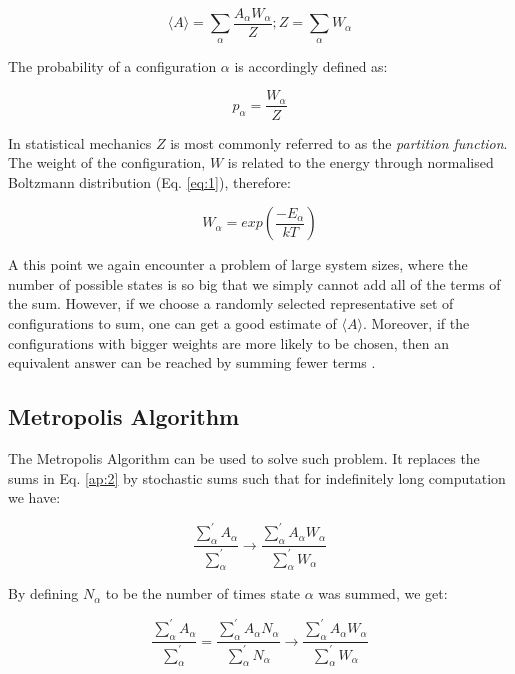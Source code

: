 \begin{equation}
\label{ap:2}
	\langle A \rangle = \sum_{\alpha} \frac{A_{\alpha}W_{\alpha}}{Z}; 
	Z =  \sum_{\alpha} W_{\alpha}
\end{equation}

The probability of a configuration $\alpha$ is accordingly defined as:

\begin{equation}
	p_{\alpha} = \frac{W_{\alpha}}{Z}
\end{equation}

In statistical mechanics $Z$ is most commonly referred to as the \textit{partition function}. The weight of the configuration, $W$ is related to the energy through normalised Boltzmann distribution (Eq. \ref{eq:1}), therefore:

\begin{equation}
	W_{\alpha} = exp(\frac{-E_{\alpha}}{kT})
\end{equation}

A this point we again encounter a problem of large system sizes, where the number of possible states is so big that we simply cannot add all of the terms of the sum. However, if we choose a randomly selected representative set of configurations to sum, one can get a good estimate of $\langle A \rangle$. Moreover, if the configurations with bigger weights are more likely to be chosen, then an equivalent answer can be reached by summing fewer terms \cite{marchand}.

\subsection{Metropolis Algorithm}

The Metropolis Algorithm can be used to solve such problem. It replaces the sums in Eq. \ref{ap:2} by stochastic sums such that for indefinitely long computation we have:

\begin{equation}
	\label{mc:3}
	\frac{\sum_{\alpha}^{'} A_{\alpha}}{\sum_{\alpha}^{'}} \to 
	\frac{\sum_{\alpha}^{'} A_{\alpha} W_{\alpha}}{\sum_{\alpha}^{'} W_{\alpha}}
\end{equation}

By defining $N_{\alpha}$ to be the number of times state $\alpha$ was summed, we get:

\begin{equation}
	\frac{\sum_{\alpha}^{'} A_{\alpha}}{\sum_{\alpha}^{'}} =
	\frac{\sum_{\alpha}^{'} A_{\alpha} N_{\alpha}}{\sum_{\alpha}^{'} N_{\alpha}} \to 
	\frac{\sum_{\alpha}^{'} A_{\alpha} W_{\alpha}}{\sum_{\alpha}^{'} W_{\alpha}}
\end{equation}


